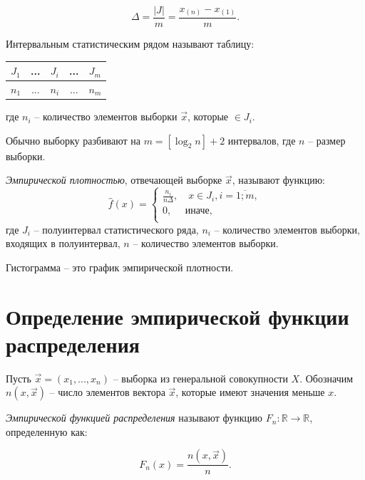 \documentclass[12pt]{report}
\begin{document}
\begin{equation*}
    \Delta = \frac{|J|}{m} = \displaystyle\frac{x_{(n)} - x_{(1)}}{m}.
\end{equation*}

Интервальным статистическим рядом называют таблицу:

\begin{table}[htb]
    \centering
    \begin{tabular}{|c|c|c|c|c|}
        \hline
        $J_1$ & ... & $J_i$ & ... & $J_m$ \\
        \hline
        $n_1$ & ... & $n_i$ & ... & $n_m$ \\
        \hline
    \end{tabular}
\end{table}

где $n_i$ -- количество элементов выборки $\vec x$, которые $\in J_i$.

Обычно выборку разбивают на $m=[\log_2n]+2$ интервалов, где $n$ -- размер выборки.

\textit{Эмпирической плотностью}, отвечающей выборке $\vec x$, называют функцию:
\begin{equation}
    \hat f(x) =
    \begin{cases}
        \displaystyle\frac{n_i}{n \Delta}, \quad x \in J_i, i = \overline{1; m}, \\
        0, \quad \text{ иначе,} \\
    \end{cases}
\end{equation}
где $J_i$ -- полуинтервал статистического ряда, $n_i$ -- количество элементов выборки, входящих в полуинтервал, $n$ -- количество элементов выборки.

Гистограмма -- это график эмпирической плотности.

\section{Определение эмпирической функции распределения}

Пусть $\vec x = (x_1, ..., x_n)$ -- выборка из генеральной совокупности $X$. Обозначим $n(x, \vec x)$ -- число элементов вектора $\vec x$, которые имеют значения меньше $x$.

\textit{Эмпирической функцией распределения} называют функцию $F_n: \mathbb{R} \to \mathbb{R}$, определенную как:

\begin{equation}
    F_n(x) = \frac{n(x, \vec x)}{n}.
\end{equation}
\end{document}
